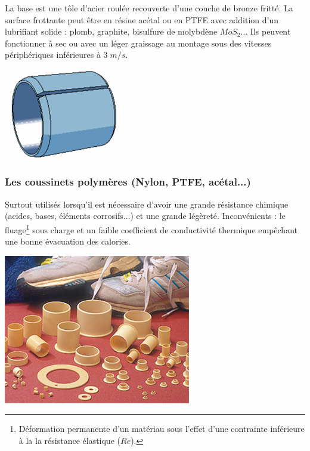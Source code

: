 \documentclass[11pt,oneside]{article}
\begin{document}
\begin{minipage}[c]{.7\linewidth}
La base est une tôle d'acier roulée recouverte d'une couche de bronze fritté. La surface frottante peut être en résine acétal ou en PTFE avec addition d'un lubrifiant solide : plomb, graphite, bisulfure de molybdène $MoS_2$...
Ils peuvent fonctionner à sec ou avec un léger graissage au montage sous des vitesses périphériques inférieures à $3\; m/s$. 
\end{minipage}\hfill
\begin{minipage}[c]{.25\linewidth}
\begin{center}
\includegraphics[width=.75\textwidth]{png/fig15}
\end{center}
\end{minipage}

\subsubsection{Les coussinets polymères (Nylon, PTFE, acétal...)}
\begin{minipage}[c]{.7\linewidth}
Surtout utilisés lorsqu'il est nécessaire d'avoir une grande résistance chimique (acides, bases, éléments corrosifs...) et une grande légèreté.
Inconvénients : le fluage\footnote{Déformation permanente d'un matériau sous l'effet d'une contrainte inférieure à la la résistance élastique ($Re$).} sous charge et un faible coefficient de conductivité thermique empêchant une bonne évacuation des calories.
\end{minipage}\hfill
\begin{minipage}[c]{.25\linewidth}
\begin{center}
\includegraphics[width=.75\textwidth]{png/fig16}
\end{center}
\end{minipage}
\end{document}
